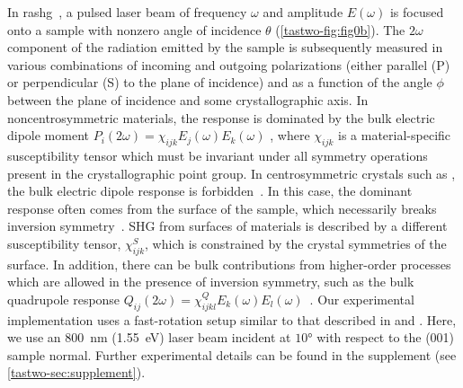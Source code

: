 In \gls{rashg}~\citep{harter_high-speed_2015, lu_fast_2018, torchinsky_structural_2015, lu_fourier_2018}, a pulsed laser beam of frequency $\omega$ and amplitude $E(\omega)$ is focused onto a sample with nonzero angle of incidence $\theta$ (\cref{tastwo-fig:fig0b}).
The $2\omega$ component of the radiation emitted by the sample is subsequently measured in various combinations of incoming and outgoing polarizations (either parallel (P) or perpendicular (S) to the plane of incidence) and as a function of the angle $\phi$ between the plane of incidence and some crystallographic axis.
In noncentrosymmetric materials, the response is dominated by the bulk electric dipole moment $P_i(2\omega) = \chi_{ijk}E_j(\omega)E_k(\omega)$ \citep{boyd}, where $\chi_{ijk}$ is a material-specific susceptibility tensor which must be invariant under all symmetry operations present in the crystallographic point group.
In centrosymmetric crystals such as \tastwo, the bulk electric dipole response is forbidden~\citep{boyd, powell}.
In this case, the dominant response often comes from the surface of the sample, which necessarily breaks inversion symmetry~\citep{bloembergen_optical_1968}.
SHG from surfaces of materials is described by a different susceptibility tensor, $\chi_{ijk}^S$, which is constrained by the crystal symmetries of the surface.
In addition, there can be bulk contributions from higher-order processes which are allowed in the presence of inversion symmetry, such as the bulk quadrupole response $Q_{ij}(2\omega) = \chi^Q_{ijkl}E_k(\omega)E_l(\omega)$~\citep{kumar_magnetic_2017, shen}.
Our experimental implementation uses a fast-rotation setup similar to that described in \citet{harter_high-speed_2015} and \citet{torchinsky_low_2014}.
Here, we use an \qty{800}{nm} (\qty{1.55}{eV}) laser beam incident at $\ang{10}$ with respect to the (001) sample normal.
Further experimental details can be found in the supplement (see \cref{tastwo-sec:supplement}).

